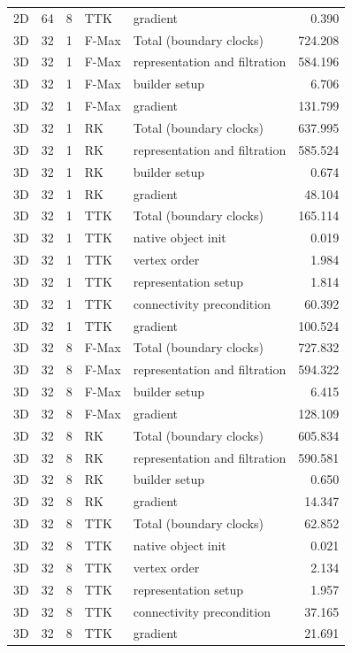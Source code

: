 \begin{tabular}{lrrllr}
2D & 64 & 8 & TTK & gradient & 0.390 \\
3D & 32 & 1 & F-Max & Total (boundary clocks) & 724.208 \\
3D & 32 & 1 & F-Max & representation and filtration & 584.196 \\
3D & 32 & 1 & F-Max & builder setup & 6.706 \\
3D & 32 & 1 & F-Max & gradient & 131.799 \\
3D & 32 & 1 & RK & Total (boundary clocks) & 637.995 \\
3D & 32 & 1 & RK & representation and filtration & 585.524 \\
3D & 32 & 1 & RK & builder setup & 0.674 \\
3D & 32 & 1 & RK & gradient & 48.104 \\
3D & 32 & 1 & TTK & Total (boundary clocks) & 165.114 \\
3D & 32 & 1 & TTK & native object init & 0.019 \\
3D & 32 & 1 & TTK & vertex order & 1.984 \\
3D & 32 & 1 & TTK & representation setup & 1.814 \\
3D & 32 & 1 & TTK & connectivity precondition & 60.392 \\
3D & 32 & 1 & TTK & gradient & 100.524 \\
3D & 32 & 8 & F-Max & Total (boundary clocks) & 727.832 \\
3D & 32 & 8 & F-Max & representation and filtration & 594.322 \\
3D & 32 & 8 & F-Max & builder setup & 6.415 \\
3D & 32 & 8 & F-Max & gradient & 128.109 \\
3D & 32 & 8 & RK & Total (boundary clocks) & 605.834 \\
3D & 32 & 8 & RK & representation and filtration & 590.581 \\
3D & 32 & 8 & RK & builder setup & 0.650 \\
3D & 32 & 8 & RK & gradient & 14.347 \\
3D & 32 & 8 & TTK & Total (boundary clocks) & 62.852 \\
3D & 32 & 8 & TTK & native object init & 0.021 \\
3D & 32 & 8 & TTK & vertex order & 2.134 \\
3D & 32 & 8 & TTK & representation setup & 1.957 \\
3D & 32 & 8 & TTK & connectivity precondition & 37.165 \\
3D & 32 & 8 & TTK & gradient & 21.691 \\
\hline
\end{tabular}
